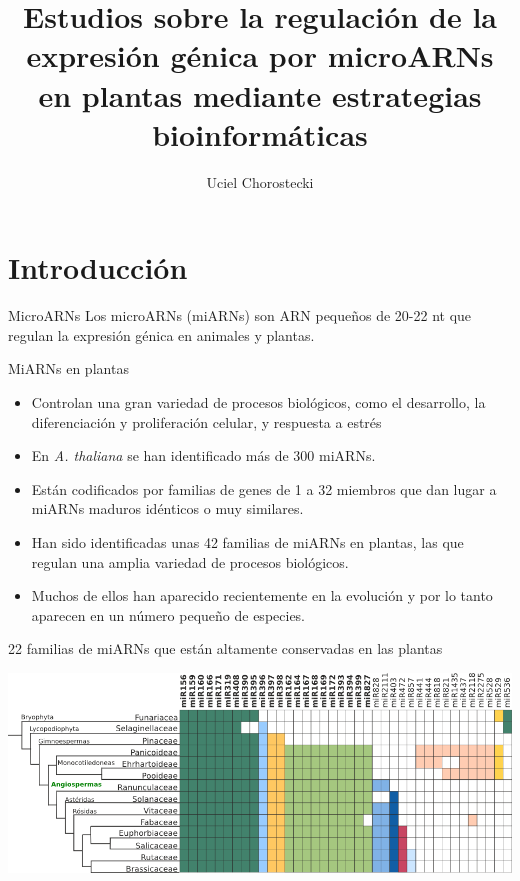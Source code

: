 \documentclass{beamer}
\title[]{Estudios sobre la regulación de la expresión génica por microARNs en plantas mediante estrategias bioinformáticas}
\author{Uciel Chorostecki}
\institute[IBR]{ \\Director Dr. Javier Palatnik\\Instituto Biología Molecular y Celular Rosario}
\date{}
\begin{document}
\frame{\titlepage}

\section{Introducción}

\begin{frame}{MicroARNs}
        Los microARNs (miARNs) son ARN pequeños de 20-22 nt que regulan la expresión génica en animales y plantas. 
\end{frame}


\begin{frame}{MiARNs en plantas}
    \begin{itemize}
        \item Controlan una gran variedad de procesos biológicos, como el desarrollo, la diferenciación y proliferación celular, y respuesta a estrés
        \item En \textit{A. thaliana} se han identificado más de 300 miARNs.
        \item Están codificados por familias de genes de 1 a 32 miembros que dan lugar a miARNs maduros idénticos o muy similares.
        \item Han sido identificadas unas 42 familias de miARNs en plantas, las que regulan una amplia variedad de procesos biológicos.
        \item Muchos de ellos han aparecido recientemente en la evolución y por lo tanto aparecen en un número pequeño de especies.
    \end{itemize}
\end{frame}

\begin{frame}{22 familias de miARNs que están altamente conservadas en las plantas}
	\begin{center}
		\includegraphics[width=1\textwidth]{img/familias_miRNAs_conservados.png}
	\end{center}
\end{frame}
\end{document}
